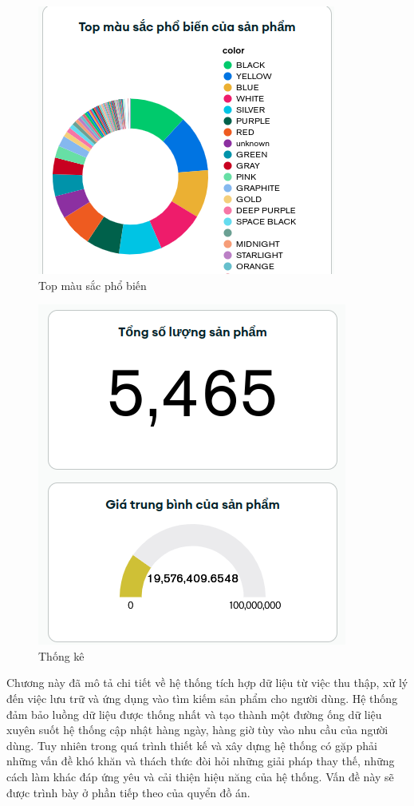 \documentclass[../DoAn.tex]{subfiles}
\begin{document}
\begin{figure}[H]
    \centering
    \includegraphics[scale=0.7]{Hinhve/topColor.png}
    \caption{Top màu sắc phổ biến}
    \label{fig:my_label2}
\end{figure}

\begin{figure}[H]
    \centering
    \includegraphics[scale=0.8]{Hinhve/topNumber.png}
    \caption{Thống kê}
    \label{fig:my_label2}
\end{figure}

Chương này đã mô tả chi tiết về hệ thống tích hợp dữ liệu từ việc thu thập, xử lý đến việc lưu trữ và ứng dụng vào tìm kiếm sản phẩm cho người dùng. Hệ thống đảm bảo luồng dữ liệu được thống nhất và tạo thành một đường ống dữ liệu xuyên suốt hệ thống cập nhật hàng ngày, hàng giờ tùy vào nhu cầu của người dùng. Tuy nhiên trong quá trình thiết kế và xây dựng hệ thống có gặp phải những vấn đề khó khăn và thách thức đòi hỏi những giải pháp thay thế, những cách làm khác đáp ứng yêu  và cải thiện hiệu năng của hệ thống. Vấn đề này sẽ được trình bày ở phần tiếp theo của quyển đồ án.
\end{document}
